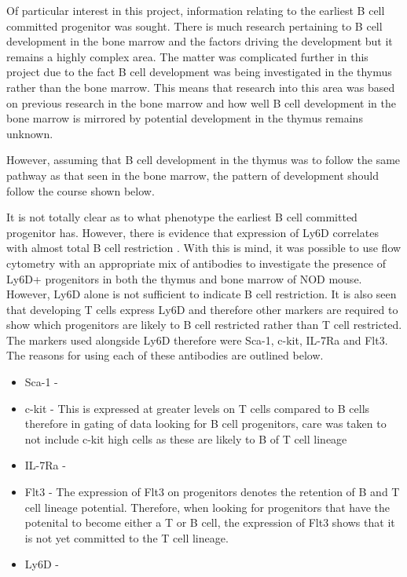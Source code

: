 Of particular interest in this project, information relating to the earliest B cell committed progenitor was sought.
There is much research pertaining to B cell development in the bone marrow and the factors driving the development but it remains a highly complex area.
The matter was complicated further in this project due to the fact B cell development was being investigated in the thymus rather than the bone marrow.
This means that research into this area was based on previous research in the bone marrow and how well B cell development in the bone marrow is mirrored by potential development in the thymus remains unknown.

 However, assuming that B cell development in the thymus was to follow the same pathway as that seen in the bone marrow, the pattern of development should follow the course shown below.

 


 It is not totally clear as to what phenotype the earliest B cell committed progenitor has. 
 However, there is evidence that expression of Ly6D correlates with almost total B cell restriction .
 With this is mind, it was possible to use flow cytometry with an appropriate mix of antibodies to investigate the presence of Ly6D+ progenitors in both the thymus and bone marrow of NOD mouse.
However, Ly6D alone is not sufficient to indicate B cell restriction. 
It is also seen that developing T cells express Ly6D and therefore other markers are required to show which progenitors are likely to B cell restricted rather than T cell restricted.
The markers used alongside Ly6D therefore were Sca-1, c-kit, IL-7Ra and Flt3. 
The reasons for using each of these antibodies are outlined below.
\begin{itemize}
\item Sca-1 - 
\item c-kit - This is expressed at greater levels on T cells compared to B cells therefore in gating of data looking for B cell progenitors, care was taken to not include c-kit high cells as these are likely to B of T cell lineage  
\item IL-7Ra - 
\item Flt3 - The expression of Flt3 on progenitors denotes the retention of B and T cell lineage potential. Therefore, when looking for progenitors that have the potenital to become either a T or B cell, the expression of Flt3 shows that it is not yet committed to the T cell lineage.
\item Ly6D - 
\end{itemize}




